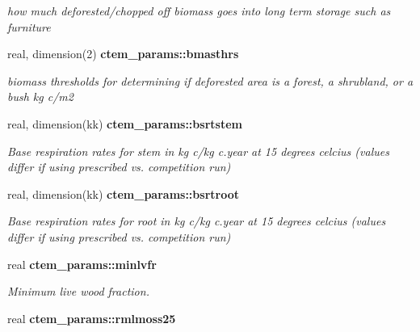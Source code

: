 \begin{DoxyCompactItemize}
\begin{DoxyCompactList}\small\item\em how much deforested/chopped off biomass goes into long term storage such as furniture \end{DoxyCompactList}\item 
\hypertarget{namespacectem__params_a49b01c9f504b799a16e1aa9224c1011f}{}real, dimension(2) {\bfseries ctem\+\_\+params\+::bmasthrs}\label{namespacectem__params_a49b01c9f504b799a16e1aa9224c1011f}

\begin{DoxyCompactList}\small\item\em biomass thresholds for determining if deforested area is a forest, a shrubland, or a bush kg c/m2 \end{DoxyCompactList}\item 
\hypertarget{namespacectem__params_a3e315466e92bff767c21df28defa0a96}{}real, dimension(kk) {\bfseries ctem\+\_\+params\+::bsrtstem}\label{namespacectem__params_a3e315466e92bff767c21df28defa0a96}

\begin{DoxyCompactList}\small\item\em Base respiration rates for stem in kg c/kg c.\+year at 15 degrees celcius (values differ if using prescribed vs. competition run) \end{DoxyCompactList}\item 
\hypertarget{namespacectem__params_a38e12fbd4194b73db2a5d635ffb9701b}{}real, dimension(kk) {\bfseries ctem\+\_\+params\+::bsrtroot}\label{namespacectem__params_a38e12fbd4194b73db2a5d635ffb9701b}

\begin{DoxyCompactList}\small\item\em Base respiration rates for root in kg c/kg c.\+year at 15 degrees celcius (values differ if using prescribed vs. competition run) \end{DoxyCompactList}\item 
\hypertarget{namespacectem__params_afd2af8cee888fd84bf7e89a6a2b5c981}{}real {\bfseries ctem\+\_\+params\+::minlvfr}\label{namespacectem__params_afd2af8cee888fd84bf7e89a6a2b5c981}

\begin{DoxyCompactList}\small\item\em Minimum live wood fraction. \end{DoxyCompactList}\item 
\hypertarget{namespacectem__params_acedcadb21474712e7f4a90bfb98ee661}{}real {\bfseries ctem\+\_\+params\+::rmlmoss25}\label{namespacectem__params_acedcadb21474712e7f4a90bfb98ee661}


\end{DoxyCompactItemize}
